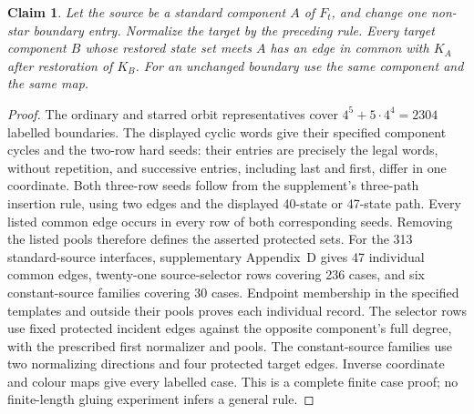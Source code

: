 \documentclass[11pt]{article}
\newtheorem{claim}{Claim}
\theoremstyle{remark}
\numberwithin{equation}{section}
\numberwithin{table}{section}
\begin{document}
\begin{claim}\label{lem:pentagon-protection}
Let the source be a standard component $A$ of $F_t$, and change one
non-star boundary entry. Normalize the target by the preceding rule.
Every target component $B$ whose restored state set meets $A$ has an
edge in common with $K_A$ after restoration of $K_B$.
For an unchanged boundary use the same component and the same map.
\end{claim}
\begin{proof}
The ordinary and starred orbit representatives cover
$4^5+5\cdot4^4=2304$ labelled boundaries. The displayed cyclic words
give their specified component cycles and the two-row hard seeds:
their entries are precisely the legal words, without repetition,
and successive entries, including last and first, differ in one
coordinate. Both three-row seeds follow from the supplement's
three-path insertion rule, using two edges and the displayed
40-state or 47-state path. Every listed common edge occurs in
every row of both corresponding seeds.
Removing the listed pools therefore defines the asserted protected sets.
For the 313 standard-source interfaces, supplementary Appendix~D gives 47
individual common edges, twenty-one source-selector rows covering 236
cases, and six constant-source families covering 30 cases.
Endpoint membership in the specified templates and outside their pools
proves each individual record. The selector rows use fixed protected
incident edges against the opposite component's full degree, with the
prescribed first normalizer and pools. The constant-source families use
two normalizing directions and four protected target edges. Inverse
coordinate and colour maps give every labelled case. This is a complete
finite case proof; no finite-length gluing experiment infers a general rule.
\end{proof}
\end{document}
